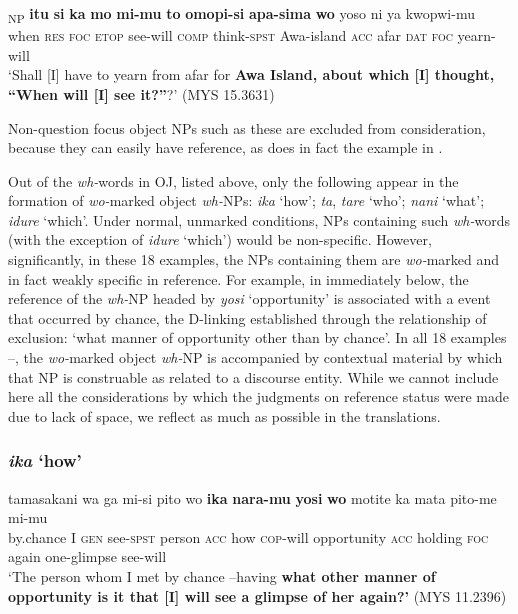 \documentclass[output=paper]{LSP/langsci}
\begin{document}
\begin{exe}
\ex%
\label{07-fr-ex:13}
\gll {\ob}\textsubscript{NP} \textbf{itu} \textbf{si} \textbf{ka} \textbf{mo} \textbf{mi-mu} \textbf{to} \textbf{omopi-si} \textbf{apa-sima} \textbf{wo}{\cb} yoso ni ya kwopwi-mu\\
{ } when \textsc{res} \textsc{foc} \textsc{etop} see-will \textsc{comp}  think-\textsc{spst} Awa-island \textsc{acc}  afar \textsc{dat} \textsc{foc} yearn-will\\
\glt ‘Shall [I] have to yearn from afar for \textbf{Awa Island, about which [I] thought, “When will [I] see it?”}?’   (MYS 15.3631)
\end{exe}

Non-question focus object NPs such as these are excluded from
consideration, because they can easily have  reference, as
does in fact the example in .

Out of the \textit{wh-}words in OJ, listed above, only the following
appear in the formation of \textit{wo-}marked object \textit{wh-}NPs:
\textit{ika} ‘how’; \textit{ta}, \textit{tare} ‘who’; \textit{nani}
‘what’; \textit{idure} ‘which’. Under normal, unmarked conditions, NPs
containing such \textit{wh-}words (with the exception of
\textit{idure} ‘which’) would be non-specific. However, significantly,
in these 18 examples, the NPs containing them are \textit{wo-}marked
and in fact weakly specific in reference. For example, in  
immediately below, the reference of the \textit{wh-}NP headed by
\textit{yosi} ‘opportunity’ is associated with a  event that
occurred by chance, the D-linking established through the relationship
of exclusion: ‘what manner of opportunity other than by chance’. In
all 18 examples --, the \textit{wo-}marked object
\textit{wh-}NP is accompanied by contextual material by which that NP
is construable as related to a  discourse entity. While we
cannot include here all the considerations by which the judgments on
reference status were made due to lack of space, we reflect as much as
possible in the translations.
 
\subsubsection{\textit{ika} ‘how’}
\label{07-subsubsec:2-2-1}

\begin{exe}
\ex%
\label{07-fr-ex:14}
\gll tamasakani wa ga mi-si pito wo \textbf{ika} \textbf{nara-mu} \textbf{yosi} \textbf{wo} motite ka mata pito-me mi-mu\\
by.chance I \textsc{gen} see-\textsc{spst} person \textsc{acc} how  \textsc{cop}-will  opportunity \textsc{acc}  holding \textsc{foc} again one-glimpse see-will\\
\glt ‘The person whom I met by chance –having \textbf{what other manner of opportunity is it that [I] will see a glimpse of her again?’}  (MYS 11.2396)
\end{exe} 
\end{document}
